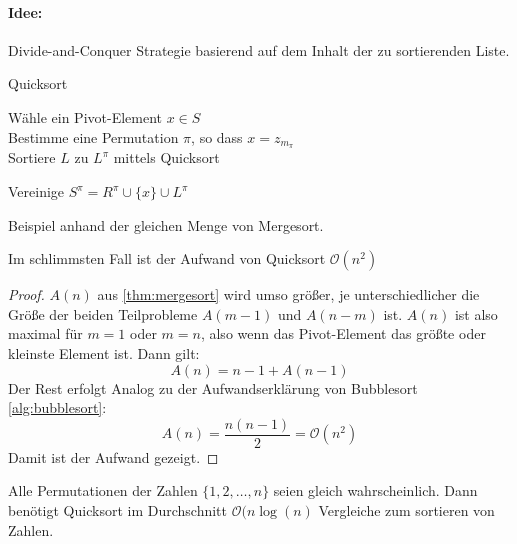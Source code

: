 \paragraph{Idee:} Divide-and-Conquer Strategie basierend auf dem Inhalt der zu sortierenden Liste.
\begin{algorithm}
\label{alg:quicksort}
\caption{Quicksort}
	Wähle ein Pivot-Element $x \in S$ \\
	Bestimme eine Permutation $\pi$, so dass $x=z_{m_{\pi}}$\\
	{
	Sortiere $L$ zu $L^{\pi}$ mittels Quicksort
	}

	Vereinige $S^{\pi}= R^{\pi} \cup \{x\} \cup L^{\pi}$
\end{algorithm}
\begin{example}
Beispiel anhand der gleichen Menge von Mergesort.
\end{example}
\begin{lemma}
Im schlimmsten Fall ist der Aufwand von Quicksort $\mathcal{O}(n^2)$
\end{lemma}
\begin{proof}
$A(n)$ aus \ref{thm:mergesort} wird umso größer, je unterschiedlicher die Größe der beiden Teilprobleme $A(m-1)$ und $A(n-m)$ ist.
$A(n)$ ist also maximal für $m=1$ oder $m=n$, also wenn das Pivot-Element das größte oder kleinste Element ist. Dann gilt:
\[
A(n)=n-1+A(n-1)
\]
Der Rest erfolgt Analog zu der Aufwandserklärung von Bubblesort \ref{alg:bubblesort}:
\[
A(n)=\frac{n(n-1)}{2}= \mathcal{O}(n^2)
\]
Damit ist der Aufwand gezeigt.
\end{proof}
\begin{theorem}
	Alle Permutationen der Zahlen $\{1,2,\ldots,n\}$ seien gleich wahrscheinlich. Dann benötigt Quicksort im Durchschnitt $\mathcal{O}(n\log(n)$ Vergleiche zum sortieren von Zahlen.
\end{theorem}

